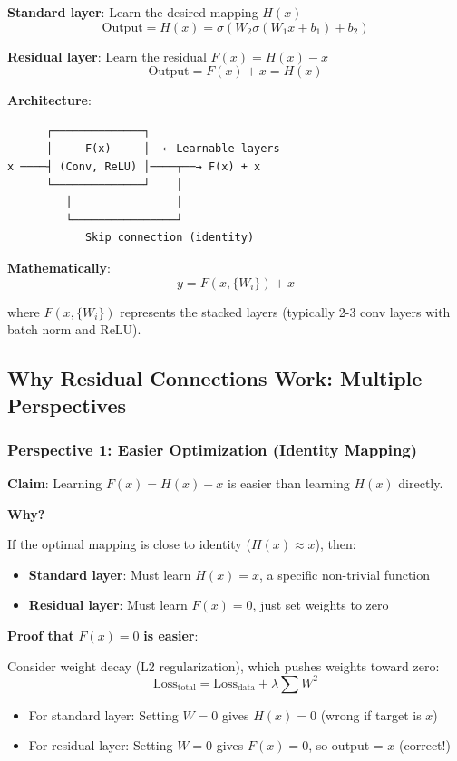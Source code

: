 \documentclass[11pt,oneside]{book}
\begin{document}
\textbf{Standard layer}: Learn the desired mapping $H(x)$
\[
\text{Output} = H(x) = \sigma(W_2\sigma(W_1 x + b_1) + b_2)
\]

\textbf{Residual layer}: Learn the residual $F(x) = H(x) - x$
\[
\text{Output} = F(x) + x = H(x)
\]

\textbf{Architecture}:
\begin{verbatim}
      ┌──────────────┐
      │     F(x)     │  ← Learnable layers
x ────┤ (Conv, ReLU) │────┬──→ F(x) + x
      └──────────────┘    │
         │                │
         └────────────────┘
            Skip connection (identity)
\end{verbatim}

\textbf{Mathematically}:
\[
y = F(x, \{W_i\}) + x
\]

where $F(x, \{W_i\})$ represents the stacked layers (typically 2-3 conv layers with batch norm and ReLU).

\subsection{Why Residual Connections Work: Multiple Perspectives}

\subsubsection{Perspective 1: Easier Optimization (Identity Mapping)}

\textbf{Claim}: Learning $F(x) = H(x) - x$ is easier than learning $H(x)$ directly.

\textbf{Why?}

If the optimal mapping is close to identity ($H(x) \approx x$), then:
\begin{itemize}
\item \textbf{Standard layer}: Must learn $H(x) = x$, a specific non-trivial function
\item \textbf{Residual layer}: Must learn $F(x) = 0$, just set weights to zero
\end{itemize}

\textbf{Proof that} $F(x) = 0$ \textbf{is easier}:

Consider weight decay (L2 regularization), which pushes weights toward zero:
\[
\text{Loss}_{\text{total}} = \text{Loss}_{\text{data}} + \lambda \sum W^2
\]

\begin{itemize}
\item For standard layer: Setting $W = 0$ gives $H(x) = 0$ (wrong if target is $x$)
\item For residual layer: Setting $W = 0$ gives $F(x) = 0$, so output = $x$ (correct!)
\end{itemize}
\end{document}
